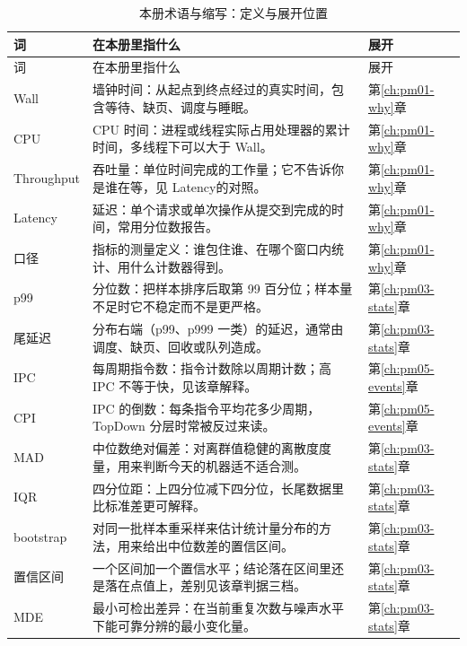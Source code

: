\documentclass[12pt,a4paper,fontset=fandol]{ctexbook}
\newcommand{\Lang}[1]{\textsf{#1}}
\newcommand{\MWall}{\Lang{Wall}}
\newcommand{\MCpu}{\Lang{CPU}}
\newcommand{\MLat}{\Lang{Latency}}
\newcommand{\MThr}{\Lang{Throughput}}
\newcommand{\Mx}[1]{\textsf{#1}}
\begin{document}
\begin{longtable}{>{\raggedright\arraybackslash}p{}
                  >{\raggedright\arraybackslash}p{}
                  >{\raggedright\arraybackslash}p{}}
\caption{本册术语与缩写：定义与展开位置}\label{tab:pmapC-glossary}\\
\toprule
词 & 在本册里指什么 & 展开 \\
\midrule
\endfirsthead
\toprule
词 & 在本册里指什么 & 展开 \\
\midrule
\endhead
\bottomrule
\endfoot
\MWall & 墙钟时间：从起点到终点经过的真实时间，包含等待、缺页、调度与睡眠。 & 第\ref{ch:pm01-why}章 \\
\MCpu & CPU 时间：进程或线程实际占用处理器的累计时间，多线程下可以大于 \MWall。 & 第\ref{ch:pm01-why}章 \\
\MThr & 吞吐量：单位时间完成的工作量；它不告诉你是谁在等，见 \MLat 的对照。 & 第\ref{ch:pm01-why}章 \\
\MLat & 延迟：单个请求或单次操作从提交到完成的时间，常用分位数报告。 & 第\ref{ch:pm01-why}章 \\
口径 & 指标的测量定义：谁包住谁、在哪个窗口内统计、用什么计数器得到。 & 第\ref{ch:pm01-why}章 \\
\Mx{p99} & 分位数：把样本排序后取第 99 百分位；样本量不足时它不稳定而不是更严格。 & 第\ref{ch:pm03-stats}章 \\
尾延迟 & 分布右端（\Mx{p99}、\Mx{p999} 一类）的延迟，通常由调度、缺页、回收或队列造成。 & 第\ref{ch:pm03-stats}章 \\
\Mx{IPC} & 每周期指令数：指令计数除以周期计数；高 \Mx{IPC} 不等于快，见该章解释。 & 第\ref{ch:pm05-events}章 \\
\Mx{CPI} & \Mx{IPC} 的倒数：每条指令平均花多少周期，TopDown 分层时常被反过来读。 & 第\ref{ch:pm05-events}章 \\
\Mx{MAD} & 中位数绝对偏差：对离群值稳健的离散度度量，用来判断今天的机器适不适合测。 & 第\ref{ch:pm03-stats}章 \\
\Mx{IQR} & 四分位距：上四分位减下四分位，长尾数据里比标准差更可解释。 & 第\ref{ch:pm03-stats}章 \\
bootstrap & 对同一批样本重采样来估计统计量分布的方法，用来给出中位数差的置信区间。 & 第\ref{ch:pm03-stats}章 \\
置信区间 & 一个区间加一个置信水平；结论落在区间里还是落在点值上，差别见该章判据三档。 & 第\ref{ch:pm03-stats}章 \\
\Mx{MDE} & 最小可检出差异：在当前重复次数与噪声水平下能可靠分辨的最小变化量。 & 第\ref{ch:pm03-stats}章 \\

\end{longtable}
\end{document}
